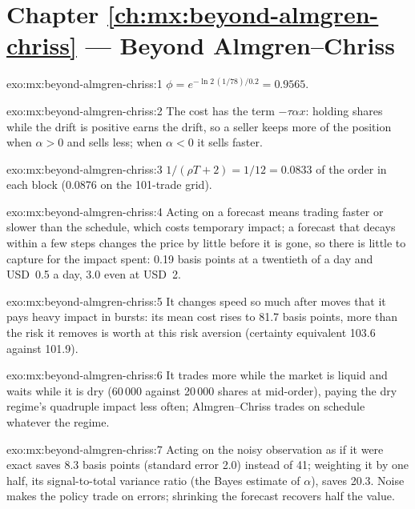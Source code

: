 \section*{Chapter \ref{ch:mx:beyond-almgren-chriss} --- Beyond Almgren--Chriss}

\begin{solution}{exo:mx:beyond-almgren-chriss:1}
$\phi=e^{-\ln2\,(1/78)/0.2}=0.9565$.
\end{solution}

\begin{solution}{exo:mx:beyond-almgren-chriss:2}
The cost has the term $-\tau\alpha x$: holding shares while the drift is positive earns the drift, so a seller keeps more of the position when $\alpha>0$
and sells less; when $\alpha<0$ it sells faster.
\end{solution}

\begin{solution}{exo:mx:beyond-almgren-chriss:3}
$1/(\rho T+2)=1/12=0.0833$ of the order in each block (0.0876 on the 101-trade grid).
\end{solution}

\begin{solution}{exo:mx:beyond-almgren-chriss:4}
Acting on a forecast means trading faster or slower than the schedule, which costs temporary impact; a forecast that decays within a few steps changes the
price by little before it is gone, so there is little to capture for the impact spent: 0.19 basis points at a twentieth of a day and USD~0.5 a day, 3.0 even
at USD~2.
\end{solution}

\begin{solution}{exo:mx:beyond-almgren-chriss:5}
It changes speed so much after moves that it pays heavy impact in bursts: its mean cost rises to 81.7 basis points, more than the risk it removes is worth
at this risk aversion (certainty equivalent 103.6 against 101.9).
\end{solution}

\begin{solution}{exo:mx:beyond-almgren-chriss:6}
It trades more while the market is liquid and waits while it is dry (60\,000 against 20\,000 shares at mid-order), paying the dry regime's quadruple impact
less often; Almgren--Chriss trades on schedule whatever the regime.
\end{solution}

\begin{solution}{exo:mx:beyond-almgren-chriss:7}
Acting on the noisy observation as if it were exact saves 8.3 basis points (standard error 2.0) instead of 41; weighting it by one half, its signal-to-total
variance ratio (the Bayes estimate of $\alpha$), saves 20.3. Noise makes the policy trade on errors; shrinking the forecast recovers half the value.
\end{solution}

